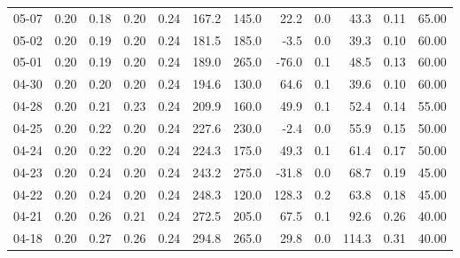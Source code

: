 \begin{threeparttable}
{\begin{tabular}{lrrrrrrrrrrr}
  05-07 &          0.20 &          0.18 &          0.20 &        0.24 &               167.2 &               145.0 &       22.2 &                 0.0 &             43.3 &            0.11 &                  65.00 \\
  05-02 &          0.20 &          0.19 &          0.20 &        0.24 &               181.5 &               185.0 &       -3.5 &                 0.0 &             39.3 &            0.10 &                  60.00 \\
  05-01 &          0.20 &          0.19 &          0.20 &        0.24 &               189.0 &               265.0 &      -76.0 &                 0.1 &             48.5 &            0.13 &                  60.00 \\
  04-30 &          0.20 &          0.20 &          0.20 &        0.24 &               194.6 &               130.0 &       64.6 &                 0.1 &             39.6 &            0.10 &                  60.00 \\
  04-28 &          0.20 &          0.21 &          0.23 &        0.24 &               209.9 &               160.0 &       49.9 &                 0.1 &             52.4 &            0.14 &                  55.00 \\
  04-25 &          0.20 &          0.22 &          0.20 &        0.24 &               227.6 &               230.0 &       -2.4 &                 0.0 &             55.9 &            0.15 &                  50.00 \\
  04-24 &          0.20 &          0.22 &          0.20 &        0.24 &               224.3 &               175.0 &       49.3 &                 0.1 &             61.4 &            0.17 &                  50.00 \\
  04-23 &          0.20 &          0.24 &          0.20 &        0.24 &               243.2 &               275.0 &      -31.8 &                 0.0 &             68.7 &            0.19 &                  45.00 \\
  04-22 &          0.20 &          0.24 &          0.20 &        0.24 &               248.3 &               120.0 &      128.3 &                 0.2 &             63.8 &            0.18 &                  45.00 \\
  04-21 &          0.20 &          0.26 &          0.21 &        0.24 &               272.5 &               205.0 &       67.5 &                 0.1 &             92.6 &            0.26 &                  40.00 \\
  04-18 &          0.20 &          0.27 &          0.26 &        0.24 &               294.8 &               265.0 &       29.8 &                 0.0 &            114.3 &            0.31 &                  40.00 \\

\end{tabular}}
\end{threeparttable}
